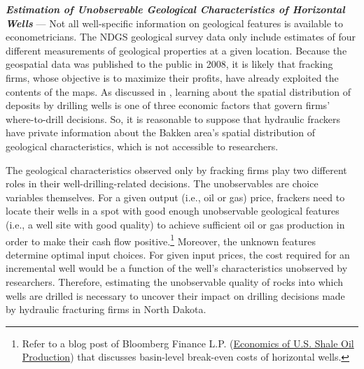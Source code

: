 \textit{\textbf{Estimation of Unobservable Geological Characteristics of Horizontal Wells}} --- Not all well-specific information on geological features is available to econometricians. The NDGS geological survey data only include estimates of four different measurements of geological properties at a given location. Because the geospatial data was published to the public in 2008, it is likely that fracking firms, whose objective is to maximize their profits, have already exploited the contents of the maps. As discussed in \cite{Learning-where-to-drill_Agerton_2020}, learning about the spatial distribution of deposits by drilling wells is one of three economic factors that govern firms' where-to-drill decisions. So, it is reasonable to suppose that hydraulic frackers have private information about the Bakken area's spatial distribution of geological characteristics, which is not accessible to researchers. 

The geological characteristics observed only by fracking firms play two different roles in their well-drilling-related decisions. The unobservables are choice variables themselves. For a given output (i.e., oil or gas) price, frackers need to locate their wells in a spot with good enough unobservable geological features (i.e., a well site with good quality) to achieve sufficient oil or gas production in order to make their cash flow positive.\footnote{Refer to a blog post of Bloomberg Finance L.P. (\href{https://about.bnef.com/blog/economics-u-s-shale-oil-production}{Economics of U.S. Shale Oil Production}) that discusses basin-level break-even costs of horizontal wells.} Moreover, the unknown features determine optimal input choices. For given input prices, the cost required for an incremental well would be a function of the well's characteristics unobserved by researchers. Therefore, estimating the unobservable quality of rocks into which wells are drilled is necessary to uncover their impact on drilling decisions made by hydraulic fracturing firms in North Dakota. 

